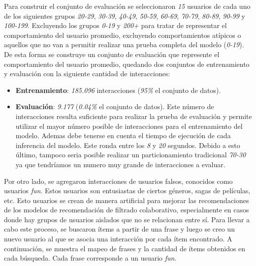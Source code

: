 \documentclass[11pt,a4paper,twoside]{thesis}
\begin{document}
Para construir el conjunto de evaluación se seleccionaron \textit{15} usuarios de cada uno de los siguientes grupos
\textit{20-29}, \textit{30-39}, \textit{40-49}, \textit{50-59}, \textit{60-69}, \textit{70-79}, \textit{80-89}, \textit{90-99} y \textit{100-199}. Excluyendo los grupos \textit{0-19} y \textit{200+} para tratar de representar el comportamiento del usuario promedio, excluyendo comportamientos atípicos o aquellos que no van a permitir realizar una prueba completa del modelo (\textit{0-19}). De esta forma se construye un conjunto de evaluación que represente el comportamiento del usuario promedio, quedando dos conjuntos de entrenamiento y evaluación con la siguiente cantidad de interacciones:

\begin{itemize}
	\item \textbf{Entrenamiento}: \textit{185.096} interacciones (\textit{95\%} el conjunto de datos).
	\item \textbf{Evaluación}: \textit{9.177} (\textit{0.04\%} el conjunto de datos). Este número de interacciones resulta suficiente para realizar la prueba de evaluación y permite utilizar el mayor número posible de interacciones para el entrenamiento del modelo. Ademas debe tenerse en cuenta el tiempo de ejecución de cada inferencia del modelo. Este ronda entre los \textit{8} y \textit{20} segundos. Debido a esto último, tampoco seria posible realizar un particionamiento tradicional \textit{70-30} ya que tendríamos un numero muy grande de interacciones a evaluar.
\end{itemize}

Por otro lado, se agregaron interacciones de usuarios falsos, conocidos como usuarios \textit{fun}. Estos usuarios son entusiastas de ciertos géneros, sagas de películas, etc. Esto usuarios se crean de manera artificial para mejorar las recomendaciones de los modelos de recomendación de filtrado colaborativo, especialmente en casos donde hay grupos de usuarios aislados que no se relacionan entre sí. Para llevar a cabo este proceso, se buscaron ítems a partir de una frase y luego se creo un nuevo usuario al que se asocia una interacción por cada ítem encontrado. A continuación, se muestra el mapeo de frases y la cantidad de ítems obtenidos en cada búsqueda. Cada frase corresponde a un usuario \textit{fun}.
\end{document}
